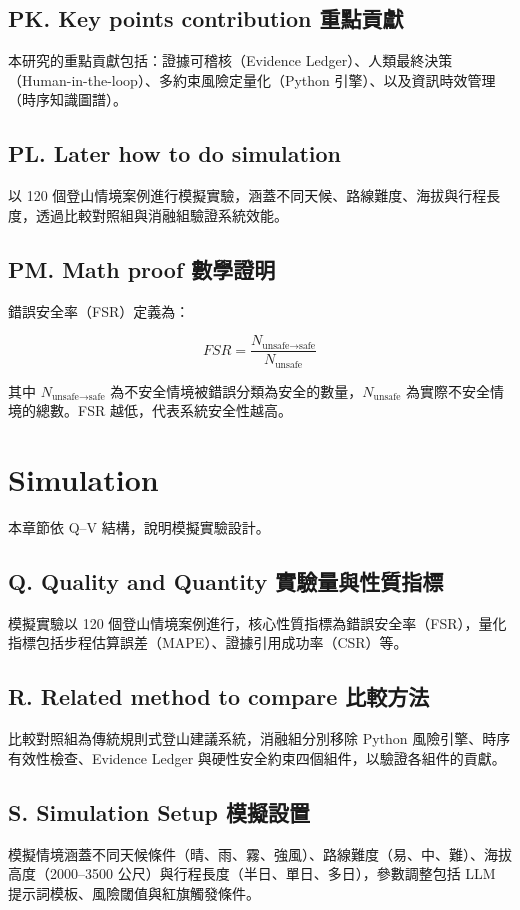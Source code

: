 \documentclass[12pt,a4paper]{article}
\begin{document}
\subsection*{PK. Key points contribution 重點貢獻}
本研究的重點貢獻包括：證據可稽核（Evidence Ledger）、人類最終決策（Human-in-the-loop）、多約束風險定量化（Python 引擎）、以及資訊時效管理（時序知識圖譜）。

\subsection*{PL. Later how to do simulation}
以 120 個登山情境案例進行模擬實驗，涵蓋不同天候、路線難度、海拔與行程長度，透過比較對照組與消融組驗證系統效能。

\subsection*{PM. Math proof 數學證明}
錯誤安全率（FSR）定義為：

\begin{equation}
FSR = \frac{N_{\text{unsafe} \rightarrow \text{safe}}}{N_{\text{unsafe}}}
\end{equation}

其中 $N_{\text{unsafe} \rightarrow \text{safe}}$ 為不安全情境被錯誤分類為安全的數量，$N_{\text{unsafe}}$ 為實際不安全情境的總數。FSR 越低，代表系統安全性越高。

\section{Simulation}
本章節依 Q–V 結構，說明模擬實驗設計。

\subsection*{Q. Quality and Quantity 實驗量與性質指標}
模擬實驗以 120 個登山情境案例進行，核心性質指標為錯誤安全率（FSR），量化指標包括步程估算誤差（MAPE）、證據引用成功率（CSR）等。

\subsection*{R. Related method to compare 比較方法}
比較對照組為傳統規則式登山建議系統，消融組分別移除 Python 風險引擎、時序有效性檢查、Evidence Ledger 與硬性安全約束四個組件，以驗證各組件的貢獻。

\subsection*{S. Simulation Setup 模擬設置}
模擬情境涵蓋不同天候條件（晴、雨、霧、強風）、路線難度（易、中、難）、海拔高度（2000–3500 公尺）與行程長度（半日、單日、多日），參數調整包括 LLM 提示詞模板、風險閾值與紅旗觸發條件。
\end{document}
